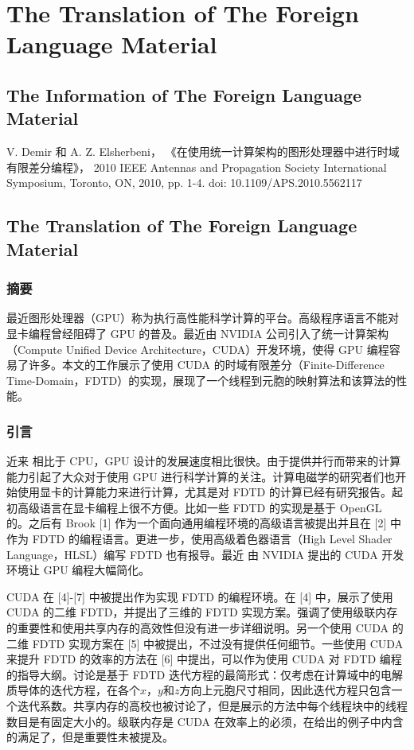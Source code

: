 
\chapter{The Translation of The Foreign Language Material}

\section{The Information of The Foreign Language Material}

V. Demir 和 A. Z. Elsherbeni， 《在使用统一计算架构的图形处理器中进行时域有限差分编程》， 2010 IEEE Antennas and Propagation Society International Symposium, Toronto, ON, 2010, pp. 1-4. doi: 10.1109/APS.2010.5562117

\section{The Translation of The Foreign Language Material}

\subsection{摘要}

最近图形处理器（GPU）称为执行高性能科学计算的平台。高级程序语言不能对显卡编程曾经阻碍了 GPU 的普及。最近由 NVIDIA 公司引入了统一计算架构（Compute Unified Device Architecture，CUDA）开发环境，使得 GPU 编程容易了许多。本文的工作展示了使用 CUDA 的时域有限差分（Finite-Difference Time-Domain，FDTD）的实现，展现了一个线程到元胞的映射算法和该算法的性能。

\subsection{引言}

近来 相比于 CPU，GPU 设计的发展速度相比很快。由于提供并行而带来的计算能力引起了大众对于使用 GPU 进行科学计算的关注。计算电磁学的研究者们也开始使用显卡的计算能力来进行计算，尤其是对 FDTD 的计算已经有研究报告。起初高级语言在显卡编程上很不方便。比如一些 FDTD 的实现是基于 OpenGL 的。之后有 Brook [1] 作为一个面向通用编程环境的高级语言被提出并且在 [2] 中作为 FDTD 的编程语言。更进一步，使用高级着色器语言（High Level Shader Language，HLSL）编写 FDTD 也有报导。最近 由 NVIDIA 提出的 CUDA 开发环境让 GPU 编程大幅简化。

CUDA 在 [4]-[7] 中被提出作为实现 FDTD 的编程环境。在 [4] 中，展示了使用 CUDA 的二维 FDTD，并提出了三维的 FDTD 实现方案。强调了使用级联内存的重要性和使用共享内存的高效性但没有进一步详细说明。另一个使用 CUDA 的二维 FDTD 实现方案在 [5] 中被提出，不过没有提供任何细节。一些使用 CUDA 来提升 FDTD 的效率的方法在 [6] 中提出，可以作为使用 CUDA 对 FDTD 编程的指导大纲。讨论是基于 FDTD 迭代方程的最简形式：仅考虑在计算域中的电解质导体的迭代方程，在各个$x$，$y$和$z$方向上元胞尺寸相同，因此迭代方程只包含一个迭代系数。共享内存的高校也被讨论了，但是展示的方法中每个线程块中的线程数目是有固定大小的。级联内存是 CUDA 在效率上的必须，在给出的例子中内含的满足了，但是重要性未被提及。

